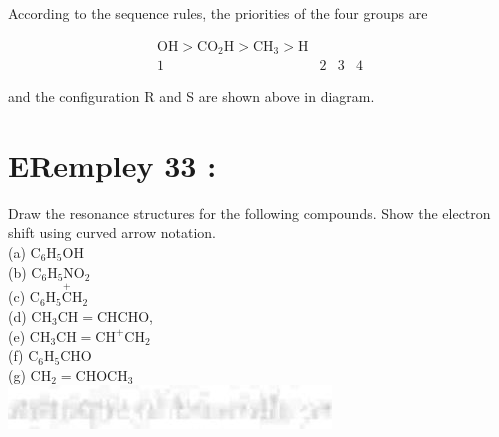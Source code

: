 \documentclass[10pt]{article}
\begin{document}
According to the sequence rules, the priorities of the four groups are

$$
\begin{array}{cccc}
\mathrm{OH}>\mathrm{CO}_{2} \mathrm{H}>\mathrm{CH}_{3}>\mathrm{H} \\
1 & 2 & 3 & 4
\end{array}
$$

and the configuration R and S are shown above in diagram.

\section*{ERempley 33 :}
Draw the resonance structures for the following compounds. Show the electron shift using curved arrow notation.\\
(a) $\mathrm{C}_{6} \mathrm{H}_{5} \mathrm{OH}$\\
(b) $\mathrm{C}_{6} \mathrm{H}_{5} \mathrm{NO}_{2}$\\
(c) $\mathrm{C}_{6} \mathrm{H}_{5} \stackrel{+}{\mathrm{C}} \mathrm{H}_{2}$\\
(d) $\mathrm{CH}_{3} \mathrm{CH}=\mathrm{CHCHO}$,\\
(e) $\mathrm{CH}_{3} \mathrm{CH}=\mathrm{CH}^{+} \mathrm{CH}_{2}$\\
(f) $\mathrm{C}_{6} \mathrm{H}_{5} \mathrm{CHO}$\\
(g) $\mathrm{CH}_{2}=\mathrm{CHOCH}_{3}$\\
\includegraphics[max width=\textwidth, center]{2025_01_28_8470952b98110cec3aabg-126(2)}
\end{document}
